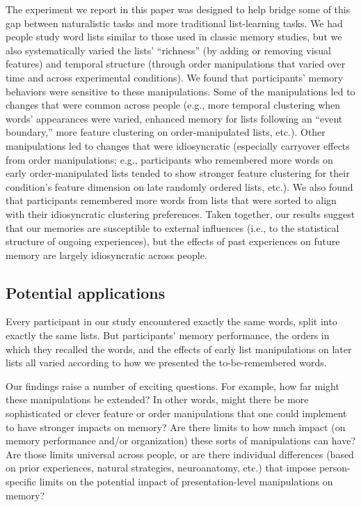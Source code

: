 \documentclass[11pt]{article}
\begin{document}
The experiment we report in this paper was designed to help bridge some of this
gap between naturalistic tasks and more traditional list-learning tasks. We had
people study word lists similar to those used in classic memory studies, but we
also systematically varied the lists' ``richness'' (by adding or removing
visual features) and temporal structure (through order manipulations that
varied over time and across experimental conditions). We found that
participants' memory behaviors were sensitive to these manipulations. Some of
the manipulations led to changes that were common across people (e.g., more
temporal clustering when words' appearances were varied, enhanced memory for
lists following an ``event boundary,'' more feature clustering on
order-manipulated lists, etc.). Other manipulations led to changes that were
idiosyncratic (especially carryover effects from order manipulations; e.g.,
participants who remembered more words on early order-manipulated lists tended
to show stronger feature clustering for their condition's feature dimension on
late randomly ordered lists, etc.). We also found that participants remembered
more words from lists that were sorted to align with their idiosyncratic
clustering preferences. Taken together, our results suggest that our memories
are susceptible to external influences (i.e., to the statistical structure of
ongoing experiences), but the effects of past experiences on future memory are
largely idiosyncratic across people.


\subsection*{Potential applications}

Every participant in our study encountered exactly the same words, split into
exactly the same lists. But participants' memory performance, the orders in
which they recalled the words, and the effects of early list manipulations on
later lists all varied according to how we presented the to-be-remembered
words.

Our findings raise a number of exciting questions. For example, how far might
these manipulations be extended? In other words, might there be more
sophisticated or clever feature or order manipulations that one could implement
to have stronger impacts on memory? Are there limits to how much impact (on
memory performance and/or organization) these sorts of manipulations can have?
Are those limits universal across people, or are there individual differences
(based on prior experiences, natural strategies, neuroanatomy, etc.) that
impose person-specific limits on the potential impact of presentation-level
manipulations on memory?
\end{document}
